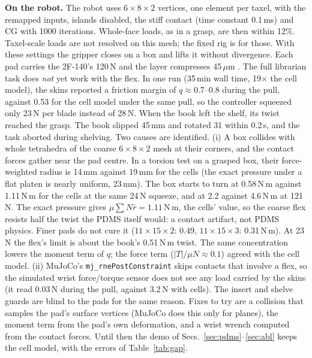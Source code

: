 \documentclass[10pt,twocolumn]{article}
\newcommand{\code}[1]{\texttt{\small #1}}
\begin{document}
\textbf{On the robot.} The robot uses $6\times8\times2$ vertices, one element per taxel, with the remapped inputs,
islands disabled, the stiff contact (time constant 0.1\,ms) and CG with 1000 iterations. Whole-face loads, as in a
grasp, are then within 12\%. Taxel-scale loads are not resolved on this mesh; the fixed rig is for those. With these
settings the gripper closes on a box and lifts it without divergence. Each pad carries the 2F-140's 120\,N and the
layer compresses 45\,$\mu$m \cite{flexstudy}.
The full librarian task does \emph{not} yet work with the flex. In one run (35\,min wall time, 19$\times$ the cell
model), the skins reported a friction margin of $q\approx0.7$--0.8 during the pull, against 0.53 for the cell
model under the same pull, so the controller squeezed only 23\,N per blade instead of 28\,N. When the book left the
shelf, its twist reached the grasp. The book slipped 45\,mm and rotated 31\textdegree{} within 0.2\,s, and the
task aborted during shelving. Two causes are identified. (i) A box collides with whole tetrahedra of the coarse
$6\times8\times2$ mesh at their corners, and the contact forces gather near the pad centre. In a torsion test on a
grasped box, their force-weighted radius is 14\,mm against 19\,mm for the cells (the exact pressure under a flat
platen is nearly uniform, 23\,mm). The box starts to turn at 0.58\,N\,m against 1.11\,N\,m for the cells at the
same 24\,N squeeze, and at 2.2 against 4.6\,N\,m at 121\,N. The exact pressure gives $\mu\sum N\bar r=1.11$\,N\,m,
the cells' value, so the coarse flex resists half the twist the PDMS itself would: a contact artifact, not PDMS
physics. Finer pads do not cure it ($11\times15\times2$: 0.49, $11\times15\times3$: 0.31\,N\,m). At 23\,N the flex's limit is about the book's 0.51\,N\,m twist. The same concentration lowers the moment term of $q$; the force term ($|T|/\mu N\approx0.1$)
agreed with the cell model. (ii) MuJoCo's \code{mj\_rnePostConstraint} skips contacts that involve a flex, so the simulated
wrist force/torque sensor does not see any load carried by the skins (it read 0.03\,N during the pull, against
3.2\,N with cells). The insert and shelve guards are blind to the pads for the same reason. Fixes to try are a
collision that samples the pad's surface vertices (MuJoCo does this only for planes), the moment term from the pad's
own deformation, and a wrist wrench computed from the contact forces. Until then the demo of Secs.~\ref{sec:pdms}--\ref{sec:abl} keeps the cell model, with the
errors of Table~\ref{tab:gap}.
\end{document}
